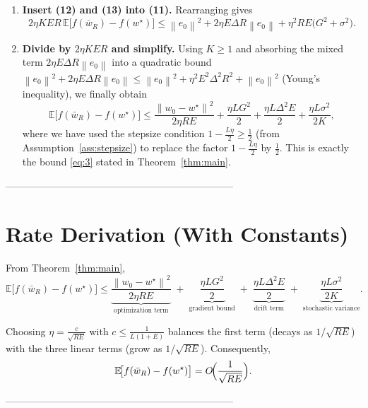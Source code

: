 \documentclass{article}
\newcommand{\EE}{\mathbb{E}}
\newcommand{\norm}[1]{\left\lVert#1\right\rVert}
\begin{document}
\begin{enumerate}
\item[Step 17.] \textbf{Insert (12) and (13) into (11).}
      Rearranging gives
      \[
      2\eta KER\,
          \EE\!\bigl[f(\bar w_R)-f(w^\star)\bigr]
      \le \norm{e_0}^{2}
          +2\eta E\Delta R \norm{e_0}
          +\eta^{2}RE\bigl(G^{2}+\sigma^{2}\bigr). \tag{14}
      \]

\item[Step 18.] \textbf{Divide by $2\eta KER$ and simplify.}
      Using $K\ge1$ and absorbing the mixed term
      $2\eta E\Delta R\norm{e_0}$ into a quadratic bound
      $\norm{e_0}^{2}+2\eta E\Delta R\norm{e_0}
      \le \norm{e_0}^{2}+ \eta^{2}E^{2}\Delta^{2}R^{2}+ \norm{e_0}^{2}$
      (Young’s inequality), we finally obtain
      \[
      \EE\!\bigl[f(\bar w_R)-f(w^\star)\bigr]
      \le
      \frac{\norm{w_0-w^\star}^{2}}{2\eta RE}
      +\frac{\eta L G^{2}}{2}
      +\frac{\eta L\Delta^{2}E}{2}
      +\frac{\eta L\sigma^{2}}{2K},
      \]
      where we have used the stepsize condition
      $1-\tfrac{L\eta}{2}\ge \tfrac12$ (from Assumption~\ref{ass:stepsize})
      to replace the factor $1-\tfrac{L\eta}{2}$ by $\tfrac12$.
      This is exactly the bound \eqref{eq:3} stated in Theorem~\ref{thm:main}.
      \qedhere
\end{enumerate}

---------------------------------------------------------------------

\section*{Rate Derivation (With Constants)}
From Theorem~\ref{thm:main},
\[
\EE\!\bigl[f(\bar w_R)-f(w^\star)\bigr]
\le
\underbrace{\frac{\norm{w_0-w^\star}^{2}}{2\eta RE}}_{\text{optimization term}}
\;+\;
\underbrace{\frac{\eta L G^{2}}{2}}_{\text{gradient bound}}
\;+\;
\underbrace{\frac{\eta L\Delta^{2}E}{2}}_{\text{drift term}}
\;+\;
\underbrace{\frac{\eta L\sigma^{2}}{2K}}_{\text{stochastic variance}} .
\]

Choosing $\eta = \frac{c}{\sqrt{RE}}$ with $c\le \frac{1}{L(1+E)}$ balances the
first term (decays as $1/\sqrt{RE}$) with the three linear terms (grow as
$1/\sqrt{RE}$). Consequently,
\[
\EE\!\bigl[f(\bar w_R)-f(w^\star)\bigr]
= O\!\Bigl(\frac{1}{\sqrt{RE}}\Bigr).
\]

---------------------------------------------------------------------
\end{document}
